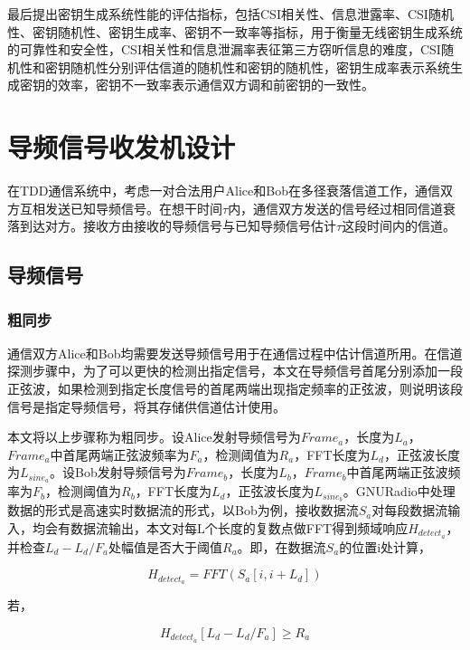 \documentclass[master]{seuthesis} %
\begin{document}
\begin{Main}
最后提出密钥生成系统性能的评估指标，包括CSI相关性、信息泄露率、CSI随机性、密钥随机性、密钥生成率、密钥不一致率等指标，用于衡量无线密钥生成系统的可靠性和安全性，CSI相关性和信息泄漏率表征第三方窃听信息的难度，CSI随机性和密钥随机性分别评估信道的随机性和密钥的随机性，密钥生成率表示系统生成密钥的效率，密钥不一致率表示通信双方调和前密钥的一致性。

\chapter{导频信号收发机设计}

在TDD通信系统中，考虑一对合法用户Alice和Bob在多径衰落信道工作，通信双方互相发送已知导频信号。在想干时间$\tau$内，通信双方发送的信号经过相同信道衰落到达对方。接收方由接收的导频信号与已知导频信号估计$\tau$这段时间内的信道。


\section{导频信号}

\subsection{粗同步}
通信双方Alice和Bob均需要发送导频信号用于在通信过程中估计信道所用。在信道探测步骤中，为了可以更快的检测出指定信号，本文在导频信号首尾分别添加一段正弦波，如果检测到指定长度信号的首尾两端出现指定频率的正弦波，则说明该段信号是指定导频信号，将其存储供信道估计使用。

本文将以上步骤称为粗同步。设Alice发射导频信号为$Frame_a$，长度为$L_a$，$Frame_a$中首尾两端正弦波频率为$F_a$，检测阈值为$R_a$，FFT长度为$L_d$，正弦波长度为$L_{sine_a}$。设Bob发射导频信号为$Frame_b$，长度为$L_b$，$Frame_b$中首尾两端正弦波频率为$F_b$，检测阈值为$R_b$，FFT长度为$L_d$，正弦波长度为$L_{sine_b}$。GNURadio中处理数据的形式是高速实时数据流的形式，以Bob为例，接收数据流$S_a$对每段数据流输入，均会有数据流输出，本文对每L个长度的复数点做FFT得到频域响应$H_{detect_a}$，并检查$ L_d - L_d / F_a $处幅值是否大于阈值$R_a$。即，在数据流$S_a$的位置i处计算，

\begin{equation}
    H_{detect_a} = FFT(S_a[i, i+L_d])
\end{equation}

若，

\begin{equation}
    H_{detect_a}[L_d - L_d / F_a] \geq R_a 
\end{equation}


\end{Main}
\end{document}
